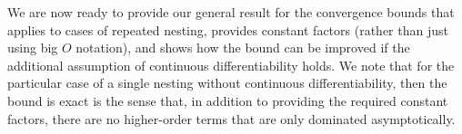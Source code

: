 We are now ready to provide our general result for the convergence bounds that applies to cases of
repeated nesting, provides constant factors (rather than just using big $O$ notation), and
shows how the bound can be improved if the additional assumption of continuous differentiability holds.
We note that for the particular case of a single nesting without continuous differentiability,
then the bound is exact is the sense that, in addition to providing the required constant factors,
there are no higher-order terms that are only dominated asymptotically.
